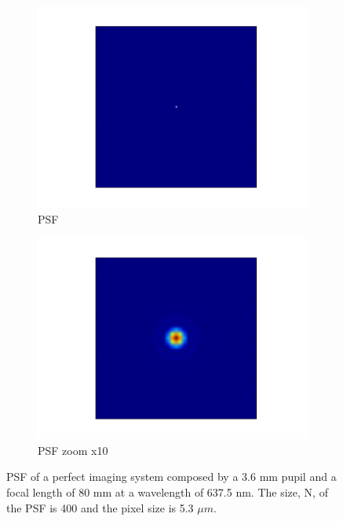 \begin{figure}
\centering
    \begin{subfigure}{0.45\textwidth}
        \includegraphics[width=\textwidth]{Figures/PSF}
        \caption{PSF}
        \label{subfig:PSF}
    \end{subfigure}
    \quad
    \begin{subfigure}{0.45\textwidth}
        \includegraphics[width=\textwidth]{Figures/PSFzoom}
        \caption{PSF zoom x10}
        \label{subfig:PSFzoom}
    \end{subfigure}
    \decoRule
    \caption{PSF of a perfect imaging system composed by a 3.6 mm pupil and a focal length of 80 mm at a wavelength of 637.5 nm. The size, N, of the PSF is 400 and the pixel size is 5.3 $\mu m$.}
    \label{fig:PSF}
\end{figure}

